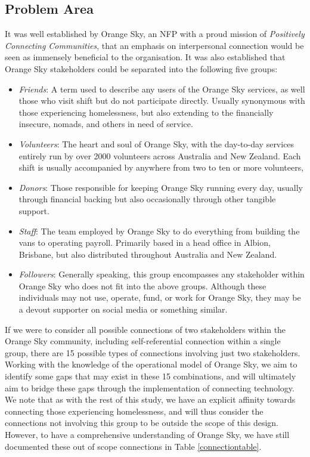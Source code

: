 \subsection{Problem Area}

It was well established by Orange Sky, an NFP with a proud mission of \emph{Positively Connecting Communities}, that an emphasis on interpersonal connection would be seen as immensely beneficial to the organisation. It was also established that Orange Sky stakeholders could be separated into the following five groups:

\begin{itemize}
    \item \emph{Friends}: A term used to describe any users of the Orange Sky services, as well those who visit shift but do not participate directly. Usually synonymous with those experiencing homelessness, but also extending to the financially insecure, nomads, and others in need of service.
    \item \emph{Volunteers}: The heart and soul of Orange Sky, with the day-to-day services entirely run by over 2000 volunteers across Australia and New Zealand. Each shift is usually accompanied by anywhere from two to ten or more volunteers,
    \item \emph{Donors}: Those responsible for keeping Orange Sky running every day, usually through financial backing but also occasionally through other tangible support.
    \item \emph{Staff}: The team employed by Orange Sky to do everything from building the vans to operating payroll. Primarily based in a head office in Albion, Brisbane, but also distributed throughout Australia and New Zealand.
    \item \emph{Followers}: Generally speaking, this group encompasses any stakeholder within Orange Sky who does not fit into the above groups. Although these individuals may not use, operate, fund, or work for Orange Sky, they may be a devout supporter on social media or something similar.
\end{itemize}

If we were to consider all possible connections of two stakeholders within the Orange Sky community, including self-referential connection within a single group, there are 15 possible types of connections involving just two stakeholders. Working with the knowledge of the operational model of Orange Sky, we aim to identify some gaps that may exist in these 15 combinations, and will ultimately aim to bridge these gaps through the implementation of connecting technology. We note that as with the rest of this study, we have an explicit affinity towards connecting those experiencing homelessness, and will thus consider the connections not involving this group to be outside the scope of this design. However, to have a comprehensive understanding of Orange Sky, we have still documented these out of scope connections in Table \ref{connectiontable}.

